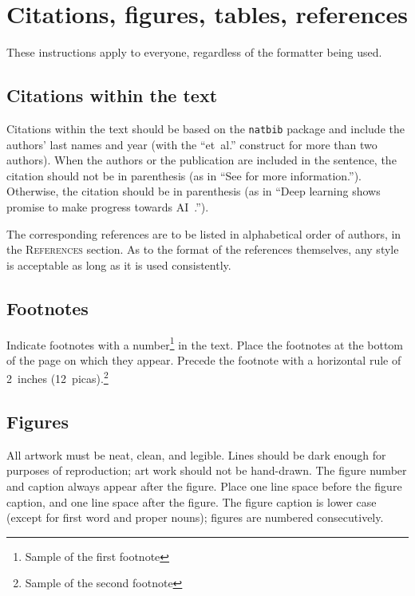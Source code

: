 \documentclass{article} %
\begin{document}
\section{Citations, figures, tables, references}
\label{others}

These instructions apply to everyone, regardless of the formatter being used.

\subsection{Citations within the text}


Citations within the text should be based on the \texttt{natbib} package
and include the authors' last names and year (with the ``et~al.'' construct
for more than two authors). When the authors or the publication are
included in the sentence, the citation should not be in parenthesis (as
in ``See \citet{Goodfellow:2016aa} for more information.''). Otherwise, the citation
should be in parenthesis (as in ``Deep learning shows promise to make progress towards AI~\citep{Goodfellow:2016aa}.'').

The corresponding references are to be listed in alphabetical order of
authors, in the \textsc{References} section. As to the format of the
references themselves, any style is acceptable as long as it is used
consistently.

\subsection{Footnotes}

Indicate footnotes with a number\footnote{Sample of the first footnote} in the
text. Place the footnotes at the bottom of the page on which they appear.
Precede the footnote with a horizontal rule of 2~inches
(12~picas).\footnote{Sample of the second footnote}

\subsection{Figures}

All artwork must be neat, clean, and legible. Lines should be dark
enough for purposes of reproduction; art work should not be
hand-drawn. The figure number and caption always appear after the
figure. Place one line space before the figure caption, and one line
space after the figure. The figure caption is lower case (except for
first word and proper nouns); figures are numbered consecutively.
\end{document}
